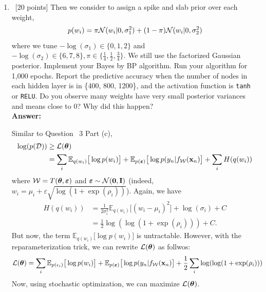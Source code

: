 \documentclass[12pt, fullpage,letterpaper]{article}
\newcommand{\beps}{\boldsymbol{\varepsilon}}
\def\red{\color{black!30!red}}
\def\blackblue{\color{black!40!blue}}
\begin{document}
\begin{enumerate}
\begin{enumerate}
{}		
		\item~[20 points] Then we consider to assign a spike and slab prior over each weight,
		\[
		p(w_i) = \pi \mathcal{N}(w_i|0, \sigma_1^2) + (1-\pi)\mathcal{N}(w_i|0, \sigma_2^2)
		\]
		where we tune $-\log(\sigma_1) \in \{0, 1, 2\}$ and $-\log(\sigma_2) \in \{6,7,8\}, \pi \in \{\frac{1}{4}, \frac{1}{2}, \frac{3}{4}\}$. We still use the factorized Gaussian posterior. Implement your Bayes by BP algorithm. Run your algorithm for 1,000 epochs. Report the predictive accuracy when the number of nodes in each hidden layer is in \{400, 800, 1200\}, and the activation function is \texttt{tanh} or \texttt{RELU}. Do you observe many weights have very small posterior variances and means close to $0$? Why did this happen?\\
{\bf \red Answer: }{\blackblue 
Similar to  Question~ 3 Part (c),  
\begin{align*}
\log(p(\mathcal{D})) & \geq \mathcal{L}(\btheta)\\
& = \sum_i \mathbb{E}_{q(w_i)}\big[\log p(w_i)\big] + \mathbb{E}_{p(\beps)} \big[\log p(y_n | f_{\mathcal{W}}(\x_n)\big] 
+ \sum_i H(q(w_i))
\end{align*}
where $\mathcal{W} = T(\btheta,\beps)$ and $\beps\sim \N(\mathbf{0}, \mathbf{I})$ (indeed, $w_i = \mu_i+\varepsilon \sqrt{\log(1+\exp(\rho_i))}$).
Again, we have 
 \begin{align*}
H\left(q(w_i)\right) & = \frac{1}{2\sigma_i^2}\mathbb{E}_{q(w_i)}\big[(w_i -\mu_i)^2\big] + \log(\sigma_i) + C\\
& = \frac{1}{2}\log(\log(1+\exp(\rho_i))) + C.
\end{align*}
But now, the term $\mathbb{E}_{q(w_i)}\big[\log p(w_i)\big]$ is untractable. However, with the reparameterization trick, we can rewrite  
$\mathcal{L}(\boldsymbol{\theta})$ as follwos:
\begin{align*}
\mathcal{L}(\btheta)
& = \sum_i \mathbb{E}_{p(\epsilon_i)}\big[\log p(w_i)\big] + \mathbb{E}_{p(\beps)} \big[\log p(y_n | f_{\mathcal{W}}(\x_n)\big] 
+ \frac{1}{2}\sum_i  \log(\log(1+\exp(\rho_i)))
\end{align*}
Now, using stochastic optimization, we can maximize $\mathcal{L}(\boldsymbol{\theta})$. 


}
\end{enumerate}
\end{enumerate}
\end{document}
